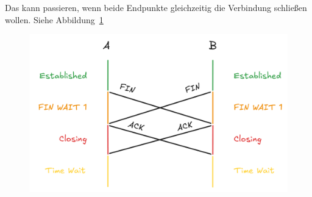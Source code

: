 \begin{enumerate}[(a)]
        Das kann passieren, wenn beide Endpunkte gleichzeitig die Verbindung
        schließen wollen. Siehe Abbildung~\ref{fig:5.11.b}

        \begin{figure}[p]
            \centering
            \includegraphics[width=1\textwidth]{./assets/5.11.b.png}
            \caption{}
            \label{fig:5.11.b}
        \end{figure}
\end{enumerate}
